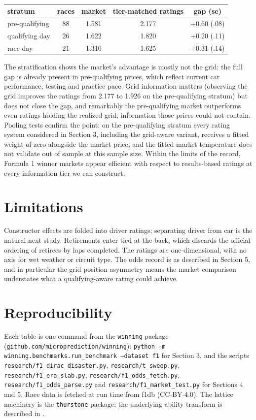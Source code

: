 \documentclass[11pt]{article}
\begin{document}
\begin{center}
\begin{tabular}{lcccc}
\toprule
stratum & races & market & tier-matched ratings & gap (se) \\
\midrule
pre-qualifying & 88 & 1.581 & 2.177 & +0.60 (.08) \\
qualifying day & 26 & 1.622 & 1.820 & +0.20 (.11) \\
race day & 21 & 1.310 & 1.625 & +0.31 (.14) \\
\bottomrule
\end{tabular}
\end{center}

The stratification shows the market's advantage is mostly not the grid:
the full gap is already present in pre-qualifying prices, which reflect
current car performance, testing and practice pace. Grid information
matters (observing the grid improves the ratings from 2.177 to 1.926 on
the pre-qualifying stratum) but does not close the gap, and remarkably the
pre-qualifying market outperforms even ratings holding the realized grid,
information those prices could not contain. Pooling tests confirm the
point: on the pre-qualifying stratum every rating system considered in
Section 3, including the grid-aware variant, receives a fitted weight of
zero alongside the market price, and the fitted market temperature does
not validate out of sample at this sample size. Within the limits of the
record, Formula 1 winner markets appear efficient with respect to
results-based ratings at every information tier we can construct.

\section{Limitations}

Constructor effects are folded into driver ratings; separating driver from
car is the natural next study. Retirements enter tied at the back, which
discards the official ordering of retirees by laps completed. The ratings
are one-dimensional, with no axis for wet weather or circuit type. The
odds record is as described in Section 5, and in particular the grid
position asymmetry means the market comparison understates what a
qualifying-aware rating could achieve.

\section*{Reproducibility}

Each table is one command from the \texttt{winning} package
(\texttt{github.com/microprediction/winning}):
\texttt{python -m winning.benchmarks.run\_benchmark --dataset f1} for
Section 3, and the scripts \texttt{research/f1\_dirac\_disaster.py},
\texttt{research/t\_sweep.py}, \texttt{research/f1\_era\_slab.py},
\texttt{research/f1\_odds\_fetch.py}, \texttt{research/f1\_odds\_parse.py}
and \texttt{research/f1\_market\_test.py} for Sections 4 and 5. Race data
is fetched at run time from f1db (CC-BY-4.0). The lattice machinery is the
\texttt{thurstone} package; the underlying ability transform is described
in \citet{cotton2021}.
\end{document}

